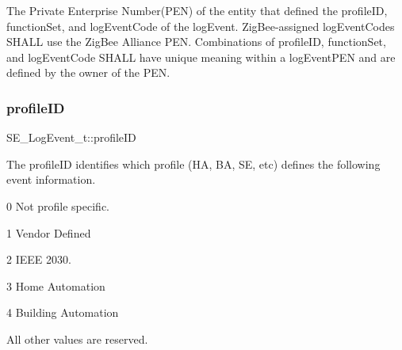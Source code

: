 The Private Enterprise Number(\+P\+E\+N) of the entity that defined the profile\+ID, function\+Set, and log\+Event\+Code of the log\+Event. Zig\+Bee-\/assigned log\+Event\+Codes S\+H\+A\+LL use the Zig\+Bee Alliance P\+EN. Combinations of profile\+ID, function\+Set, and log\+Event\+Code S\+H\+A\+LL have unique meaning within a log\+Event\+P\+EN and are defined by the owner of the P\+EN. \mbox{\label{group__LogEvent_ga2e3fe4dcccd980fb39556aca65124b51}} 
\subsubsection{\texorpdfstring{profile\+ID}{profileID}}
{\footnotesize\ttfamily S\+E\+\_\+\+Log\+Event\+\_\+t\+::profile\+ID}

The profile\+ID identifies which profile (HA, BA, SE, etc) defines the following event information.

0 Not profile specific.

1 Vendor Defined

2 I\+E\+EE 2030.

3 Home Automation

4 Building Automation

All other values are reserved. 